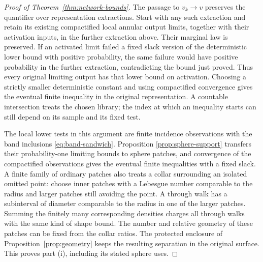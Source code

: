 \begin{proof}[Proof of Theorem~\ref{thm:network-bounds}]
The passage to \(v_k\to v\) preserves the quantifier over representation
extractions.  Start with any such extraction and retain its existing
compactified local annular output limits, together with their activation
inputs, in the further extraction above.  Their marginal law is preserved.
If an activated limit failed a fixed slack version of the deterministic
lower bound with positive probability, the same failure would have positive
probability in the further extraction, contradicting the bound just proved.
Thus every original limiting output has that lower bound on activation.
Choosing a strictly smaller deterministic constant and using compactified
convergence gives the eventual finite inequality in the original
representation.  A countable intersection treats the chosen library;
the index at which an inequality starts can still depend on its sample
and its fixed test.

The local lower tests in this argument are finite incidence observations
with the band inclusions \eqref{eq:band-sandwich}.  Proposition
\ref{prop:sphere-support} transfers their probability-one limiting bounds
to sphere patches, and convergence of the compactified observations gives
the eventual finite inequalities with a fixed slack.  A finite family of
ordinary patches also treats a collar surrounding an isolated omitted
point: choose inner patches with a Lebesgue number comparable to the
radius and larger patches still avoiding the point.  A through walk has
a subinterval of diameter comparable to the radius in one of the larger
patches.  Summing the finitely many corresponding densities charges all
through walks with the same kind of shape bound.  The number and relative
geometry of these patches can be fixed from the collar ratios.  The
protected enclosure of Proposition~\ref{prop:geometry} keeps the resulting
separation in the original surface.  This proves part (i), including its
stated sphere uses.


\end{proof}
